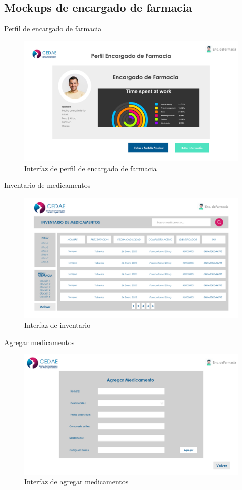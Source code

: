 \documentclass[12pt,letterpaper]{article}
\begin{document}
        \subsection{Mockups de encargado de farmacia}
        Perfil de encargado de farmacia
            \begin{figure}[H]
                \centering
                \includegraphics [scale=0.19]{far_perfil}
                \caption{Interfaz de perfil de encargado de farmacia}
            \end{figure}
        Inventario de medicamentos
            \begin{figure}[H]
                \centering
                \includegraphics [scale=0.18]{far_inv_medicamento}
                \caption{Interfaz de inventario}
            \end{figure}
        Agregar medicamentos
            \begin{figure}[H]
                \centering
                \includegraphics [scale=0.2]{far_add_medicamento}
                \caption{Interfaz de agregar medicamentos}
            \end{figure}
\end{document}

